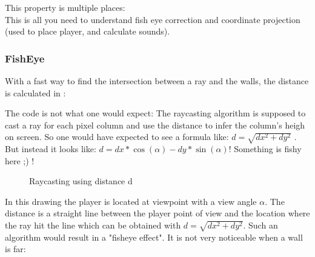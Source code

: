 \par
\begin{figure}[H]
\centering
 
\end{figure}

This property is multiple places:\\
This is all you need to understand fish eye correction and coordinate projection (used to place player, and calculate sounds).












\subsubsection{FishEye}
With a fast way to find the intersection between a ray and the walls, the distance is calculated in :\\

\begin{minipage}{\textwidth}

\end{minipage}

The code is not what one would expect: The raycasting algorithm is supposed to cast a ray for each pixel column and use the distance  to infer the column's heigh on screen. So one would have expected to see a formula like:
$ d = \sqrt{dx^2 + dy^2}$ . But instead it looks like: $d = dx * \cos(\alpha) - dy * \sin(\alpha) $! Something is fishy here ;) !\\
\par
\begin{figure}[H]
\centering
 
 \caption{Raycasting using distance d} \label{fig:Raycasting2}
\end{figure}

In this drawing the player is located at viewpoint with a view angle \begin{math}\alpha\end{math}. The distance  is a straight line between the player point of view and the location where the ray hit the line which can be obtained with $d = \sqrt{dx^2 + dy^2}$. Such an algorithm would result in a "fisheye effect". It is not very noticeable when a wall is far:

